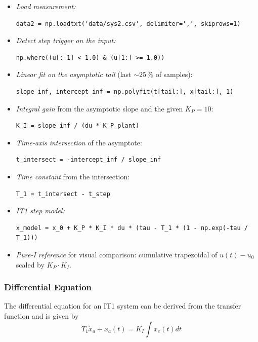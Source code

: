 \documentclass[12pt, oneside, a4paper]{scrreprt}
\begin{document}
\begin{itemize}
    \item \emph{Load measurement:}
    \begin{lstlisting}
data2 = np.loadtxt('data/sys2.csv', delimiter=',', skiprows=1)
    \end{lstlisting}

    \item \emph{Detect step trigger on the input:}
    \begin{lstlisting}
np.where((u[:-1] < 1.0) & (u[1:] >= 1.0))
    \end{lstlisting}

    \item \emph{Linear fit on the asymptotic tail} (last $\sim 25\,\%$ of samples):
    \begin{lstlisting}
slope_inf, intercept_inf = np.polyfit(t[tail:], x[tail:], 1)
    \end{lstlisting}

    \item \emph{Integral gain} from the asymptotic slope and the given $K_P = 10$:
    \begin{lstlisting}
K_I = slope_inf / (du * K_P_plant)
    \end{lstlisting}

    \item \emph{Time-axis intersection} of the asymptote:
    \begin{lstlisting}
t_intersect = -intercept_inf / slope_inf
    \end{lstlisting}

    \item \emph{Time constant} from the intersection:
    \begin{lstlisting}
T_1 = t_intersect - t_step
    \end{lstlisting}

    \item \emph{IT1 step model:}
    \begin{lstlisting}
x_model = x_0 + K_P * K_I * du * (tau - T_1 * (1 - np.exp(-tau / T_1)))
    \end{lstlisting}

    \item \emph{Pure-I reference} for visual comparison: cumulative trapezoidal of $u(t) - u_0$ scaled by $K_P \cdot K_I$.
\end{itemize}

                \subsubsection{Differential Equation}
                    The differential equation for an IT1 system can be derived from the transfer function and is given by
                    \begin{equation}
                        T_1 \dot{x}_a + x_a(t) = K_I \int x_e(t) dt
                    \end{equation}
\end{document}
